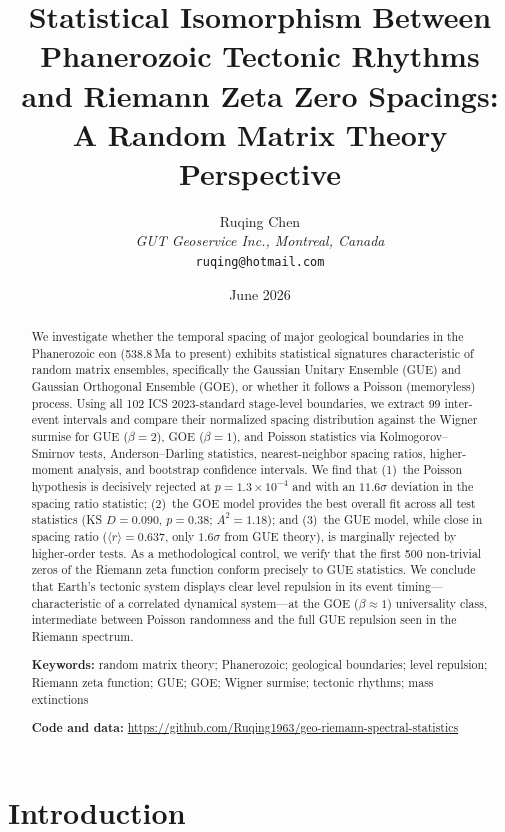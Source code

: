 \documentclass[12pt,a4paper]{article}
\title{\textbf{Statistical Isomorphism Between Phanerozoic Tectonic Rhythms \\
and Riemann Zeta Zero Spacings: \\
A Random Matrix Theory Perspective}}
\author{
    Ruqing Chen \\
    \textit{GUT Geoservice Inc., Montreal, Canada} \\
    \texttt{ruqing@hotmail.com}
}
\date{June 2026}
\begin{document}
\maketitle

\begin{abstract}
We investigate whether the temporal spacing of major geological boundaries in the Phanerozoic eon (538.8\,Ma to present) exhibits statistical signatures characteristic of random matrix ensembles, specifically the Gaussian Unitary Ensemble (GUE) and Gaussian Orthogonal Ensemble (GOE), or whether it follows a Poisson (memoryless) process. Using all 102 ICS 2023-standard stage-level boundaries, we extract 99 inter-event intervals and compare their normalized spacing distribution against the Wigner surmise for GUE ($\beta=2$), GOE ($\beta=1$), and Poisson statistics via Kolmogorov--Smirnov tests, Anderson--Darling statistics, nearest-neighbor spacing ratios, higher-moment analysis, and bootstrap confidence intervals. We find that (1)~the Poisson hypothesis is decisively rejected at $p = 1.3 \times 10^{-4}$ and with an $11.6\sigma$ deviation in the spacing ratio statistic; (2)~the GOE model provides the best overall fit across all test statistics (KS $D = 0.090$, $p = 0.38$; $A^2 = 1.18$); and (3)~the GUE model, while close in spacing ratio ($\langle r \rangle = 0.637$, only $1.6\sigma$ from GUE theory), is marginally rejected by higher-order tests. As a methodological control, we verify that the first 500 non-trivial zeros of the Riemann zeta function conform precisely to GUE statistics. We conclude that Earth's tectonic system displays clear level repulsion in its event timing---characteristic of a correlated dynamical system---at the GOE ($\beta \approx 1$) universality class, intermediate between Poisson randomness and the full GUE repulsion seen in the Riemann spectrum.

\medskip
\noindent\textbf{Keywords:} random matrix theory; Phanerozoic; geological boundaries; level repulsion; Riemann zeta function; GUE; GOE; Wigner surmise; tectonic rhythms; mass extinctions

\medskip
\noindent\textbf{Code and data:} \url{https://github.com/Ruqing1963/geo-riemann-spectral-statistics}
\end{abstract}


\section{Introduction}
\end{document}

